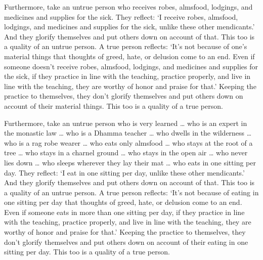 \documentclass[12pt,openany]{book}%
\begin{document}
Furthermore, take an untrue person who receives robes, almsfood, lodgings, and medicines and supplies for the sick. They reflect: ‘I receive robes, almsfood, lodgings, and medicines and supplies for the sick, unlike these other mendicants.’ And they glorify themselves and put others down on account of that. This too is a quality of an untrue person. A true person reflects: ‘It’s not because of one’s material things that thoughts of greed, hate, or delusion come to an end. Even if someone doesn’t receive robes, almsfood, lodgings, and medicines and supplies for the sick, if they practice in line with the teaching, practice properly, and live in line with the teaching, they are worthy of honor and praise for that.’ Keeping the practice to themselves, they don’t glorify themselves and put others down on account of their material things. This too is a quality of a true person. 

Furthermore, take an untrue person who is very learned … who is an expert in the monastic law … who is a Dhamma teacher … who dwells in the wilderness … who is a rag robe wearer … who eats only almsfood … who stays at the root of a tree … who stays in a charnel ground … who stays in the open air … who never lies down … who sleeps wherever they lay their mat … who eats in one sitting per day. They reflect: ‘I eat in one sitting per day, unlike these other mendicants.’ And they glorify themselves and put others down on account of that. This too is a quality of an untrue person. A true person reflects: ‘It’s not because of eating in one sitting per day that thoughts of greed, hate, or delusion come to an end. Even if someone eats in more than one sitting per day, if they practice in line with the teaching, practice properly, and live in line with the teaching, they are worthy of honor and praise for that.’ Keeping the practice to themselves, they don’t glorify themselves and put others down on account of their eating in one sitting per day. This too is a quality of a true person. 
\end{document}

